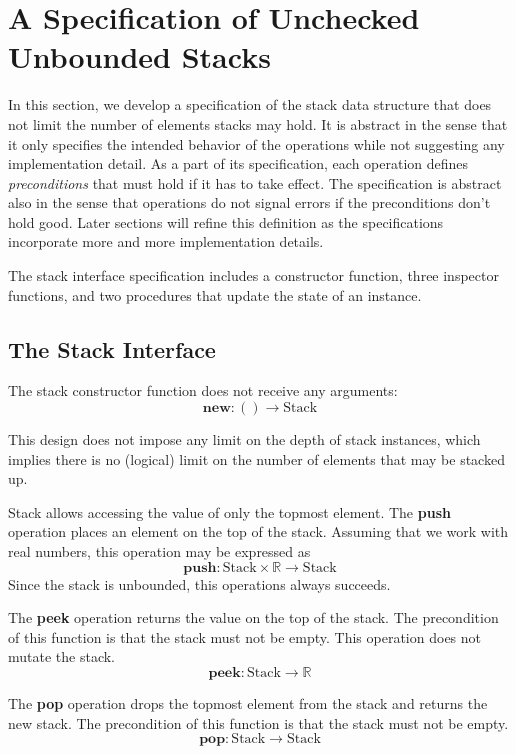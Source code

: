 \documentclass[10pt]{article}
\begin{document}
\section{A Specification of Unchecked Unbounded Stacks}
\noindent In this section, we develop a specification of the stack data structure that does not limit the number of elements stacks may hold. It is abstract in the sense that it only specifies the intended behavior of the operations while not suggesting any implementation detail. As a part of its specification, each operation defines \emph{preconditions} that must hold if it has to take effect. The specification is abstract also in the sense that operations do not signal errors if the preconditions don't hold good. Later sections will refine this definition as the specifications incorporate more and more implementation details.

The stack interface specification includes a constructor function, three inspector functions, and two procedures that update the state of an instance. 

\subsection{The Stack Interface}
\noindent The stack constructor function does not receive any arguments:
\[
\textbf{new}: \mathbf{()} \rightarrow \mathrm{Stack}
\]

\noindent This design does not impose any limit on the depth of stack instances, which implies there is no (logical) limit on the number of elements that may be stacked up.

Stack allows accessing the value of only the topmost element. The \textbf{push} operation places an element on the top of the stack. Assuming that we work with real numbers, this operation may be expressed as
\[
\textbf{push}: \mathrm{Stack} \times \mathbb{R} \rightarrow \mathrm{Stack}
\]
Since the stack is unbounded, this operations always succeeds.

The \textbf{peek} operation returns the value on the top of the stack. The precondition of this function is that the stack must not be empty. This operation does not mutate the stack.
\[
\textbf{peek}: \mathrm{Stack} \rightarrow {\mathbb{R}}
\]

The {\textbf{pop}} operation drops the topmost element from the stack and returns the new stack. The precondition of this function is that the stack must not be empty.
\[
\textbf{pop}: \mathrm{Stack} \rightarrow \mathrm{Stack}
\]
\end{document}
